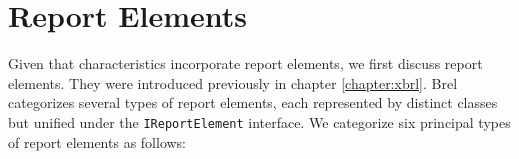 \section{Report Elements}
\label{sec:api_report_elements}






Given that characteristics incorporate report elements, we first discuss report elements.
They were introduced previously in chapter \ref{chapter:xbrl}.
Brel categorizes several types of report elements, each represented by distinct classes but unified under the \texttt{IReportElement} interface.
We categorize six principal types of report elements as follows:

